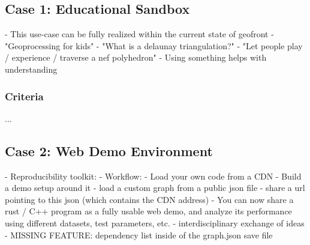 \subsection*{Case 1: Educational Sandbox}

- This use-case can be fully realized within the current state of geofront
- "Geoprocessing for kids"
- "What is a delaunay triangulation?" 
- "Let people play / experience / traverse a nef polyhedron"
- Using something helps with understanding

\subsubsection*{Criteria}
...

\subsection*{Case 2: Web Demo Environment}

- Reproducibility toolkit:
- Workflow: 
  - Load your own code from a CDN
  - Build a demo setup around it
  - load a custom graph from a public json file
  - share a url pointing to this json (which contains the CDN address)
- You can now share a rust / C++ program as a fully usable web demo,   
  and analyze its performance using different datasets, test parameters, etc. 
- interdisciplinary exchange of ideas
- MISSING FEATURE: dependency list inside of the graph.json save file




